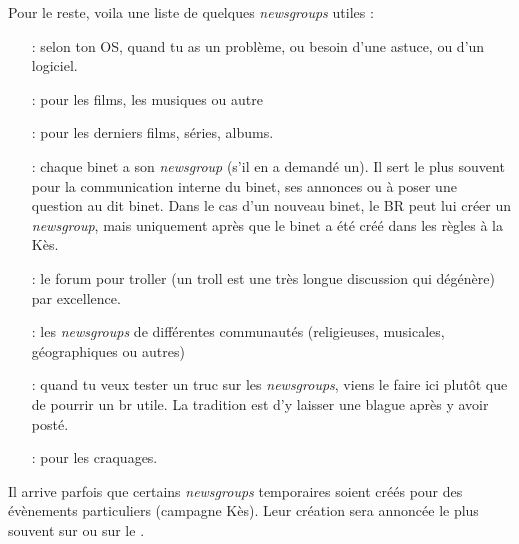 Pour le reste, voila une liste de quelques \emph{newsgroups} utiles :
\begin{itemize}

\item[\ngname{br.informatique.windows/linux/mac} :] selon ton OS, quand tu as un problème, ou besoin d'une astuce, ou d'un logiciel.

\item[\ngname{br.informatique.media.request.*} :] pour les films, les musiques ou autre

\item[\ngname{br.informatique.media.nouveautes} :] pour les derniers films, séries, albums.

\item[\ngname{br.binet.ton\_binet} :] chaque binet a son \emph{newsgroup} (s'il en a demandé un). Il sert le plus souvent pour la communication interne du binet, ses annonces ou à poser une question au dit binet. Dans le cas d'un nouveau binet, le BR peut lui créer un \emph{newsgroup}, mais uniquement après que le binet a été créé dans les règles à la Kès.

\item[\ngname{br.binet.polemix} :] le forum pour troller (un troll est une très longue discussion qui dégénère) par excellence.
                          
\item[\ngname{br.communauté.*} :] les \emph{newsgroups} de différentes communautés (religieuses, musicales, géographiques ou autres)

\item[\ngname{br.test} :] quand tu veux tester un truc sur les \emph{newsgroups}, viens le faire ici plutôt que de pourrir un br utile. La tradition est d'y laisser une blague après y avoir posté.

 \item[\ngname{br.trash} :] pour les craquages.

\end{itemize}


Il arrive parfois que certains \emph{newsgroups} temporaires soient créés pour des évènements particuliers (campagne Kès). Leur création sera annoncée
le plus souvent sur \fkz ou sur le .

